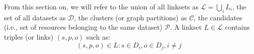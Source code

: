 

From this section on, we will refer to the union of all linksets as $\mathcal{L} = \bigcup_i L_i$, the set of all datasets as $\mathcal{D}$, the clusters (or graph partitions) as $\mathcal{C}$, the candidates (i.e., set of resources belonging to the same dataset) $\mathcal{P}$.
A linkset $L \in \mathcal{L}$ contains triples (or links) $(s,p,o)$ such as:
\begin{equation} \label{eq:linkset}
(s,p,o) \in L : s \in D_i, o \in D_j, i \neq j
\end{equation}

